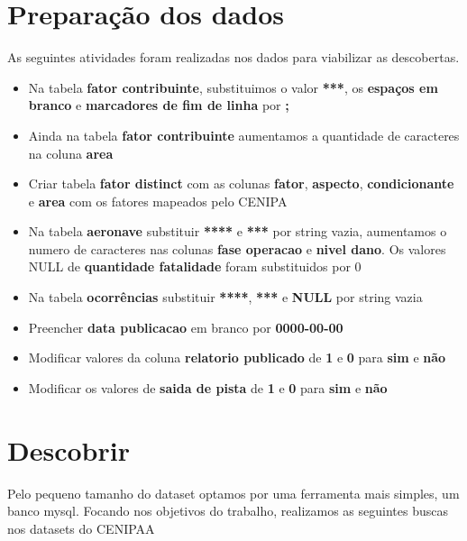 \documentclass[conference]{IEEEtran}
\begin{document}
\section{Preparação dos dados}

As seguintes atividades foram realizadas nos dados para viabilizar as descobertas.

\begin{itemize}
 \item Na tabela \textbf{fator contribuinte}, substituimos o valor \textbf{***}, os \textbf{espaços em branco} e \textbf{marcadores de fim de linha} por \textbf{;}
 \item Ainda na tabela \textbf{fator contribuinte} aumentamos a quantidade de caracteres na coluna \textbf{area}
 \item Criar tabela \textbf{fator distinct} com as colunas \textbf{fator}, \textbf{aspecto}, \textbf{condicionante} e \textbf{area} com os fatores mapeados pelo CENIPA
 \item Na tabela \textbf{aeronave} substituir \textbf{****} e \textbf{***} por string vazia, aumentamos o numero de caracteres nas colunas \textbf{fase operacao} e \textbf{nivel dano}. Os valores NULL de \textbf{quantidade fatalidade} foram substituidos por 0 
 \item Na tabela \textbf{ocorrências} substituir \textbf{****}, \textbf{***} e \textbf{NULL} por string vazia
 \item Preencher \textbf{data publicacao} em branco por \textbf{0000-00-00}
 \item Modificar valores da coluna \textbf{relatorio publicado} de \textbf{1} e \textbf{0} para \textbf{sim} e \textbf{não}
 \item Modificar os valores de \textbf{saida de pista} de \textbf{1} e \textbf{0} para \textbf{sim} e \textbf{não}
\end{itemize}

\section{Descobrir}

Pelo pequeno tamanho do dataset optamos por uma ferramenta mais simples, um banco mysql. Focando nos objetivos do trabalho, realizamos as seguintes buscas nos datasets 
do CENIPAA\\
\end{document}
